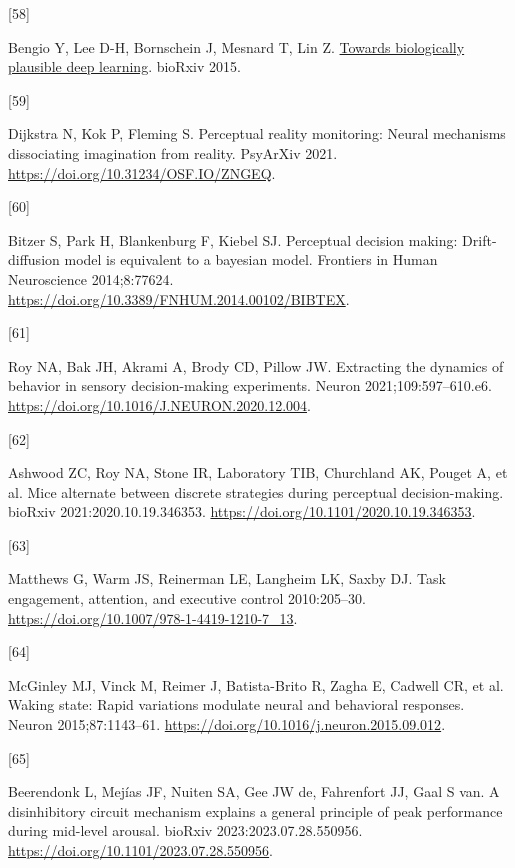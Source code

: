 \documentclass[
]{article}
\newlength{\cslhangindent}
\newlength{\csllabelwidth}
\newlength{\cslentryspacingunit} %
\newenvironment{CSLReferences}[2] %
 {%
  \setlength{\parindent}{0pt}
  \ifodd #1
  \let\oldpar\par
  \def\par{\hangindent=\cslhangindent\oldpar}
  \fi
  \setlength{\parskip}{#2\cslentryspacingunit}
 }%
 {}
\newcommand{\CSLLeftMargin}[1]{\parbox[t]{\csllabelwidth}{#1}}
\newcommand{\CSLRightInline}[1]{\parbox[t]{\linewidth - \csllabelwidth}{#1}\break}
\begin{document}
\begin{CSLReferences}{0}{0}
\leavevmode{}%
\CSLLeftMargin{{[}58{]} }%
\CSLRightInline{Bengio Y, Lee D-H, Bornschein J, Mesnard T, Lin Z.
\href{http://arxiv.org/abs/1502.04156}{Towards biologically plausible
deep learning}. bioRxiv 2015.}

\leavevmode{}%
\CSLLeftMargin{{[}59{]} }%
\CSLRightInline{Dijkstra N, Kok P, Fleming S. Perceptual reality
monitoring: Neural mechanisms dissociating imagination from reality.
PsyArXiv 2021. \url{https://doi.org/10.31234/OSF.IO/ZNGEQ}.}

\leavevmode{}%
\CSLLeftMargin{{[}60{]} }%
\CSLRightInline{Bitzer S, Park H, Blankenburg F, Kiebel SJ. Perceptual
decision making: Drift-diffusion model is equivalent to a bayesian
model. Frontiers in Human Neuroscience 2014;8:77624.
\url{https://doi.org/10.3389/FNHUM.2014.00102/BIBTEX}.}

\leavevmode{}%
\CSLLeftMargin{{[}61{]} }%
\CSLRightInline{Roy NA, Bak JH, Akrami A, Brody CD, Pillow JW.
Extracting the dynamics of behavior in sensory decision-making
experiments. Neuron 2021;109:597--610.e6.
\url{https://doi.org/10.1016/J.NEURON.2020.12.004}.}

\leavevmode{}%
\CSLLeftMargin{{[}62{]} }%
\CSLRightInline{Ashwood ZC, Roy NA, Stone IR, Laboratory TIB, Churchland
AK, Pouget A, et al. Mice alternate between discrete strategies during
perceptual decision-making. bioRxiv 2021:2020.10.19.346353.
\url{https://doi.org/10.1101/2020.10.19.346353}.}

\leavevmode{}%
\CSLLeftMargin{{[}63{]} }%
\CSLRightInline{Matthews G, Warm JS, Reinerman LE, Langheim LK, Saxby
DJ. Task engagement, attention, and executive control 2010:205--30.
\url{https://doi.org/10.1007/978-1-4419-1210-7_13}.}

\leavevmode{}%
\CSLLeftMargin{{[}64{]} }%
\CSLRightInline{McGinley MJ, Vinck M, Reimer J, Batista-Brito R, Zagha
E, Cadwell CR, et al. Waking state: Rapid variations modulate neural and
behavioral responses. Neuron 2015;87:1143--61.
\url{https://doi.org/10.1016/j.neuron.2015.09.012}.}

\leavevmode{}%
\CSLLeftMargin{{[}65{]} }%
\CSLRightInline{Beerendonk L, Mejías JF, Nuiten SA, Gee JW de,
Fahrenfort JJ, Gaal S van. A disinhibitory circuit mechanism explains a
general principle of peak performance during mid-level arousal. bioRxiv
2023:2023.07.28.550956.
\url{https://doi.org/10.1101/2023.07.28.550956}.}


\end{CSLReferences}
\end{document}
